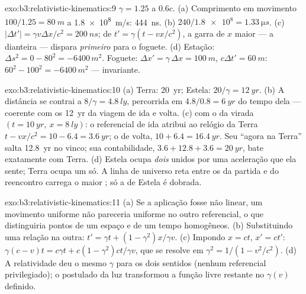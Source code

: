 \begin{solution}{exo:b3:relativistic-kinematics:9}
$\gamma = 1.25$ a $0.6c$. (a) Comprimento em movimento
$100/1.25 = \qty{80}{m}$ a \qty{1.8e8}{m/s}: \qty{444}{ns}. (b)
$240/\num{1.8e8} =
\qty{1.33}{\micro s}$. (c) $|\Delta t'| = \gamma v\Delta x/c^2 =
\qty{200}{ns}$; de $t' = \gamma(t - vx/c^2)$, a garra de $x$ maior ---
a dianteira --- dispara \emph{primeiro} para o foguete. (d)
Estação: $\Delta s^2 = 0 - 80^2 = -6400\,\unit{m^2}$. Foguete: $\Delta
x' = \gamma\,\Delta x = \qty{100}{m}$, $c\Delta t' = \qty{60}{m}$:
$60^2 - 100^2 = -6400\,\unit{m^2}$ --- invariante.
\end{solution}

\begin{solution}{exo:b3:relativistic-kinematics:10}
(a) Terra: \qty{20}{yr}; Estela: $20/\gamma = \qty{12}{yr}$. (b) A
distância se contrai a $8/\gamma = \qty{4.8}{ly}$, percorrida em $4.8/0.8
= \qty{6}{yr}$ do tempo dela --- coerente com os \qty{12}{yr} da
viagem de ida e volta. (c)  com o  da virada $(t =
\qty{10}{yr},\ x = \qty{8}{ly})$: o referencial de ida atribui ao
relógio da Terra $t - vx/c^2 = 10 - 6.4 = \qty{3.6}{yr}$; o de volta, $10 +
6.4 = \qty{16.4}{yr}$. Seu ``agora na Terra'' salta
\qty{12.8}{yr} no vinco; sua contabilidade,
$3.6 + 12.8 + 3.6 = \qty{20}{yr}$, bate exatamente com Terra. (d)
Estela ocupa \emph{dois}  unidos por uma
aceleração que ela sente; Terra ocupa um só. A linha de universo reta
entre os  da partida e do reencontro carrega o maior ; só a de Estela é dobrada.
\end{solution}

\begin{solution}{exo:b3:relativistic-kinematics:11}
(a) Se a aplicação fosse não linear, um movimento uniforme não
pareceria uniforme no outro referencial, o que distinguiria pontos de
um espaço e de um tempo homogêneos. (b) Substituindo uma relação na
outra: $t' = \gamma t +
(1 - \gamma^2)x/\gamma v$. (c) Impondo $x = ct$, $x' = ct'$:
$\gamma(c - v)t = c\gamma t + c(1 - \gamma^2)ct/\gamma v$, que se
resolve em $\gamma^2 = 1/(1 - v^2/c^2)$. (d) A relatividade deu o mesmo
$\gamma$ para os dois sentidos (nenhum referencial privilegiado); o
postulado da luz transformou a função livre restante no $\gamma(v)$
definido.
\end{solution}

